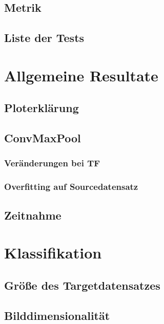 \documentclass[ngerman]{report}
\begin{document}
    \section{Metrik}
    
    \section{Liste der Tests}
    

    \chapter{Allgemeine Resultate}  %
    \section{Ploterklärung}
    
    \section{ConvMaxPool}
    
    \subsection{Veränderungen bei TF}
    
    \subsection{Overfitting auf Sourcedatensatz}
    
    \section{Zeitnahme}
    

    \chapter{Klassifikation}  %
    \section{Größe des Targetdatensatzes}
    \section{Bilddimensionalität}
\end{document}
